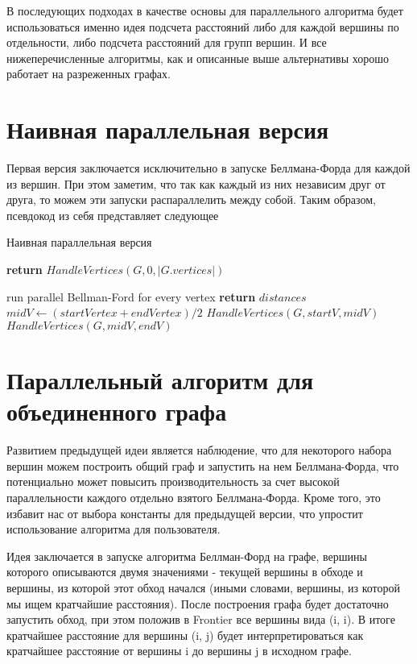 В последующих подходах в качестве основы для параллельного алгоритма будет использоваться именно идея подсчета расстояний либо для каждой вершины по отдельности, либо подсчета расстояний для групп вершин. И все нижеперечисленные алгоритмы, как и описанные выше альтернативы хорошо работает на разреженных графах.

\FloatBarrier
\section{Наивная параллельная версия}
Первая версия заключается исключительно в запуске Беллмана-Форда для каждой из вершин. При этом заметим, что так как каждый из них независим друг от друга, то можем эти запуски распараллелить между собой. Таким образом, псевдокод из себя представляет следующее


\FloatBarrier
\begin{algorithm}
\caption{Наивная параллельная версия}\label{all_pairs_par1}
\begin{algorithmic}[1]
\State \textbf{return} $HandleVertices(G, 0, |G.vertices|)$
\EndProcedure
\State
{}

	\State run parallel Bellman-Ford for every vertex 
	\State \textbf{return} $distances$	
\Else	
	\State $midV \gets (startVertex + endVertex) / 2$ 
	\State $HandleVertices(G, startV, midV)$
	\State $HandleVertices(G, midV, endV)$	
\EndIf

\EndProcedure

\end{algorithmic}
\end{algorithm}

\FloatBarrier
\section{Параллельный алгоритм для объединенного графа}
Развитием предыдущей идеи является наблюдение, что для некоторого набора вершин можем построить общий граф и запустить на нем Беллмана-Форда, что потенциально может повысить производительность за счет высокой параллельности каждого отдельно взятого Беллмана-Форда. Кроме того, это избавит нас от выбора константы для предыдущей версии, что упростит использование алгоритма для пользователя. 

Идея заключается в запуске алгоритма Беллман-Форд на графе, вершины которого описываются двумя значениями - текущей вершины в обходе и вершины, из которой этот обход начался (иными словами, вершины, из которой мы ищем кратчайшие расстояния). После построения графа будет достаточно запустить обход, при этом положив в Frontier все вершины вида (i, i). В итоге кратчайшее расстояние для вершины (i, j) будет интерпретироваться как кратчайшее расстояние от вершины i до вершины j в исходном графе. 

